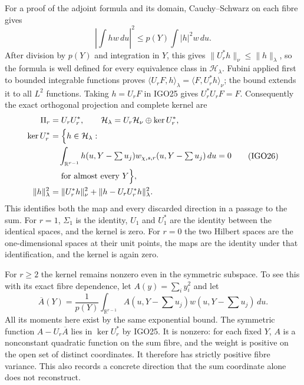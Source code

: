 \documentclass[11pt,a4paper]{article}
\begin{document}
For a proof of the adjoint formula and its domain, Cauchy--Schwarz
on each fibre gives
\[|\int hw\,du|^2\leq p(Y)\int|h|^2w\,du.\]
After division by $p(Y)$ and integration in $Y$, this gives
$\|U_r^*h\|_{\nu}\leq\|h\|_{\lambda}$, so the formula is
well defined for every equivalence class in $\mathcal H_\lambda$.
Fubini applied first to bounded integrable functions proves
$\langle U_rF,h\rangle_\lambda=\langle F,U_r^*h\rangle_\nu$;
the bound extends it to all $L^2$ functions. Taking $h=U_rF$
in IGO25 gives $U_r^*U_rF=F$. Consequently the exact orthogonal
projection and complete kernel are
\[
 \begin{split}
 \Pi_r&=U_rU_r^*,\qquad
 \mathcal H_\lambda=U_r\mathcal H_\nu\mathbin{\oplus}\ker U_r^*,\\
 \ker U_r^*&=\Bigl\{h\in\mathcal H_\lambda:\\
 &\quad\int_{\mathbb R^{r-1}}h(u,Y-\textstyle\sum u_j)
     w_{\chi,s,r}(u,Y-\textstyle\sum u_j)\,du=0\\
 &\quad\text{ for almost every }Y\Bigr\},\\
 \|h\|_\lambda^2&=\|U_r^*h\|_\nu^2+
                   \|h-U_rU_r^*h\|_\lambda^2.
 \end{split}
 \tag{IGO26}
\]
This identifies both the map and every discarded direction
in a passage to the sum. For $r=1$, $\Sigma_1$ is the identity,
$U_1$ and $U_1^*$ are the identity between the identical spaces,
and the kernel is zero. For $r=0$ the two Hilbert spaces are
the one-dimensional spaces at their unit points, the maps
are the identity under that identification, and the kernel
is again zero.

For $r\geq2$ the kernel remains nonzero even in the symmetric
subspace. To see this with its exact fibre dependence, let
$A(y)=\sum_i y_i^2$ and let
\[
 \overline A(Y)=\frac{1}{p(Y)}
     \int_{\mathbb R^{r-1}}A(u,Y-\textstyle\sum u_j)
                 w(u,Y-\textstyle\sum u_j)\,du.
\]
All its moments here exist by the same exponential bound.
The symmetric function $A-U_r\overline A$ lies in
$\ker U_r^*$ by IGO25. It is nonzero: for each fixed $Y$,
$A$ is a nonconstant quadratic function on the sum fibre,
and the weight is positive on the open set of distinct
coordinates. It therefore has strictly positive fibre
variance. This also records a concrete direction that the
sum coordinate alone does not reconstruct.
\end{document}
